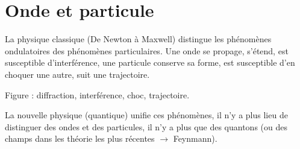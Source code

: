 \section{Onde et particule}
La physique classique (De Newton à Maxwell) distingue les phénomènes ondulatoires des phénomènes particulaires. Une onde se propage, s'étend, est susceptible d'interférence, une particule conserve sa forme, est susceptible d'en choquer une autre, suit une trajectoire.

\begin{center}
{\sf Figure : diffraction, interférence, choc, trajectoire.}
\end{center}

La nouvelle physique (quantique) unifie ces phénomènes, il n'y a plus lieu de distinguer des ondes et des particules, il n'y a plus que des quantons (ou des champs dans les théorie les plus récentes $\to$ Feynmann).
